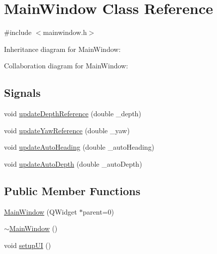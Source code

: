 \hypertarget{class_main_window}{}\section{Main\+Window Class Reference}
\label{class_main_window}


{\ttfamily \#include $<$mainwindow.\+h$>$}



Inheritance diagram for Main\+Window\+:


Collaboration diagram for Main\+Window\+:
\subsection*{Signals}
\begin{DoxyCompactItemize}
\item 
void \mbox{\hyperlink{class_main_window_a5f74d765bf269b11fa170d7883fbf134}{update\+Depth\+Reference}} (double \+\_\+depth)
\item 
void \mbox{\hyperlink{class_main_window_ae64085dc959c76a25d207446e5052d3c}{update\+Yaw\+Reference}} (double \+\_\+yaw)
\item 
void \mbox{\hyperlink{class_main_window_a3396959981d06581fb8b10f19cbded2a}{update\+Auto\+Heading}} (double \+\_\+auto\+Heading)
\item 
void \mbox{\hyperlink{class_main_window_acca8a0048231eaa5f025bd86030ee883}{update\+Auto\+Depth}} (double \+\_\+auto\+Depth)
\end{DoxyCompactItemize}
\subsection*{Public Member Functions}
\begin{DoxyCompactItemize}
\item 
\mbox{\hyperlink{class_main_window_a8b244be8b7b7db1b08de2a2acb9409db}{Main\+Window}} (Q\+Widget $\ast$parent=0)
\item 
\mbox{\hyperlink{class_main_window_ae98d00a93bc118200eeef9f9bba1dba7}{$\sim$\+Main\+Window}} ()
\item 
void \mbox{\hyperlink{class_main_window_a3a304253c9e7caeef028f75358bf1fd5}{setup\+UI}} ()
\end{DoxyCompactItemize}
